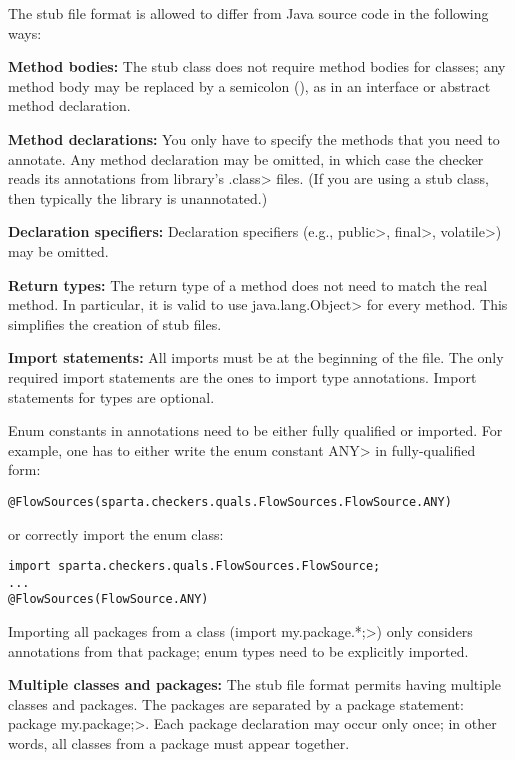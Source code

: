 The stub file format is allowed to differ from Java source code in the
following ways:
\begin{description}

\item{\textbf{Method bodies:}}
  The stub class does not require method bodies for classes; any method
  body may be replaced by a semicolon (\code{;}), as in an interface or
  abstract method declaration.

\item{\textbf{Method declarations:}}
  You only have to specify the methods that you need to annotate.
  Any method declaration may be omitted, in which case the checker reads
  its annotations from library's \<.class> files.  (If you are using a stub class, then
  typically the library is unannotated.)

\item{\textbf{Declaration specifiers:}}
  Declaration specifiers (e.g., \<public>, \<final>, \<volatile>)
  may be omitted.

\item{\textbf{Return types:}}
  The return type of a method does not need to match the real method.
  In particular, it is valid to use \<java.lang.Object> for every method.
  This simplifies the creation of stub files.

\item{\textbf{Import statements:}}
  All imports must be at the beginning of the file.
  The only required import statements are the ones to import type
  annotations.  Import statements for types are optional.

  Enum constants in annotations need to be either fully qualified
  or imported.
  For example, one has to either write the enum constant \<ANY> in
  fully-qualified form:

\begin{Verbatim}
@FlowSources(sparta.checkers.quals.FlowSources.FlowSource.ANY)
\end{Verbatim}

\noindent
or correctly import the enum class:

\begin{Verbatim}
import sparta.checkers.quals.FlowSources.FlowSource;
...
@FlowSources(FlowSource.ANY)
\end{Verbatim}

  Importing all packages from a class (\<import my.package.*;>) only
  considers annotations from that package; enum types need to be
  explicitly imported.

\item{\textbf{Multiple classes and packages:}}
  The stub file format permits having multiple classes and packages.
  The packages are separated by a package statement:
  \<package my.package;>.  Each package declaration may occur only once; in
  other words, all classes from a package must appear together.

\end{description}


